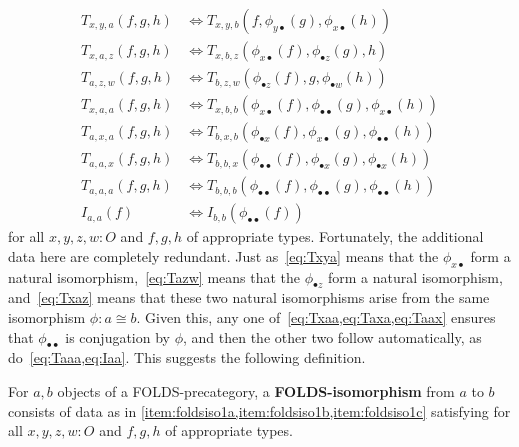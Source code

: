 \documentclass{amsart}
\begin{document}
\begin{align}
  T_{x,y,a}(f,g,h) &\Leftrightarrow T_{x,y,b}(f,\phi_{y\bullet}(g),\phi_{x\bullet}(h)) \label{eq:Txya}\\
  T_{x,a,z}(f,g,h) &\Leftrightarrow T_{x,b,z}(\phi_{x\bullet}(f),\phi_{\bullet z}(g),h) \label{eq:Txaz}\\
  T_{a,z,w}(f,g,h) &\Leftrightarrow T_{b,z,w}(\phi_{\bullet z}(f),g,\phi_{\bullet w}(h)) \label{eq:Tazw}\\
  T_{x,a,a}(f,g,h) &\Leftrightarrow T_{x,b,b}(\phi_{x\bullet}(f),\phi_{\bullet\bullet}(g),\phi_{x\bullet}(h)) \label{eq:Txaa}\\
  T_{a,x,a}(f,g,h) &\Leftrightarrow T_{b,x,b}(\phi_{\bullet x}(f),\phi_{x\bullet}(g),\phi_{\bullet\bullet}(h)) \label{eq:Taxa}\\
  T_{a,a,x}(f,g,h) &\Leftrightarrow T_{b,b,x}(\phi_{\bullet\bullet}(f),\phi_{\bullet x}(g),\phi_{\bullet x}(h)) \label{eq:Taax}\\
  T_{a,a,a}(f,g,h) &\Leftrightarrow T_{b,b,b}(\phi_{\bullet\bullet}(f),\phi_{\bullet\bullet}(g),\phi_{\bullet\bullet}(h)) \label{eq:Taaa}\\
  I_{a,a}(f) &\Leftrightarrow I_{b,b}(\phi_{\bullet\bullet}(f)) \label{eq:Iaa}
\end{align}
for all $x,y,z,w:O$ and $f,g,h$ of appropriate types.
Fortunately, the additional data here are completely redundant.
Just as~\eqref{eq:Txya} means that the $\phi_{x\bullet}$ form a natural isomorphism,~\eqref{eq:Tazw} means that the $\phi_{\bullet z}$ form a natural isomorphism, and~\eqref{eq:Txaz} means that these two natural isomorphisms arise from the same isomorphism $\phi : a\cong b$.
Given this, any one of~\autoref{eq:Txaa,eq:Taxa,eq:Taax} ensures that $\phi_{\bullet\bullet}$ is conjugation by $\phi$, and then the other two follow automatically, as do~\autoref{eq:Taaa,eq:Iaa}.
This suggests the following definition.

\begin{defn}
  For $a,b$ objects of a FOLDS-precategory, a \textbf{FOLDS-isomorphism} from $a$ to $b$ consists of data as in \autoref{item:foldsiso1a,item:foldsiso1b,item:foldsiso1c} satisfying  for all $x,y,z,w:O$ and $f,g,h$ of appropriate types.
\end{defn}
\end{document}
